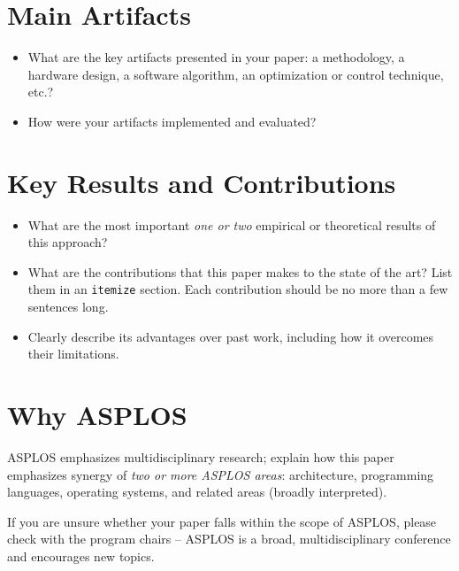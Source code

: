 \documentclass[pageno]{jpaper}
\begin{document}
\section{Main Artifacts}
\label{sec:main-artifacts}

\begin{itemize}
\item What are the key artifacts presented in your paper: a
  methodology, a hardware design, a software algorithm, an
  optimization or control technique, etc.?
  \item How were your artifacts implemented and evaluated? 
\end{itemize}

\section{Key Results and Contributions}
\label{sec:key-contributions}

\begin{itemize}
  \item What are the most important \emph{one or two} empirical or theoretical
    results of this approach?
  \item What are the contributions that this paper makes to the state of the
    art? List them in an \texttt{itemize} section. Each contribution should be no more than a few sentences long.
  \item Clearly describe its advantages over past work, including how it overcomes their limitations.
\end{itemize}


\section{Why ASPLOS}
\label{sec:why-asplos}

ASPLOS emphasizes multidisciplinary research; explain how this
  paper emphasizes synergy of \emph{two or more ASPLOS areas}: architecture,
  programming languages, operating systems, and related areas (broadly
  interpreted).

\noindent
If you are unsure whether your paper falls within the scope of ASPLOS,
please check with the program chairs -- ASPLOS is a broad,
multidisciplinary conference and encourages new topics.

 
\pagebreak


\end{document}
